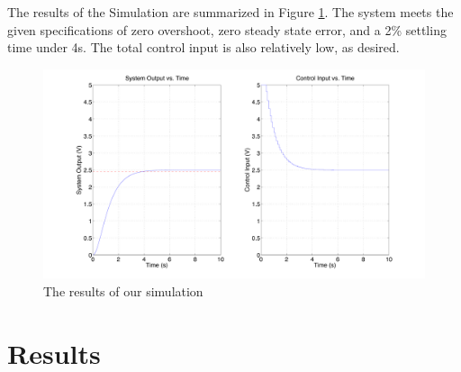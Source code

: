 \documentclass[11pt]{article}
\begin{document}
The results of the Simulation are summarized in Figure \ref{fig:results}.
The system meets the given specifications of zero overshoot, zero steady state error, and a 2\% settling time under 4s.
The total control input is also relatively low, as desired.

\begin{figure}[h]
\centering
\includegraphics[width = 0.8\linewidth]{sim_results}
\caption{The results of our simulation}\label{fig:results}
\end{figure}

\section*{Results}
\end{document}
